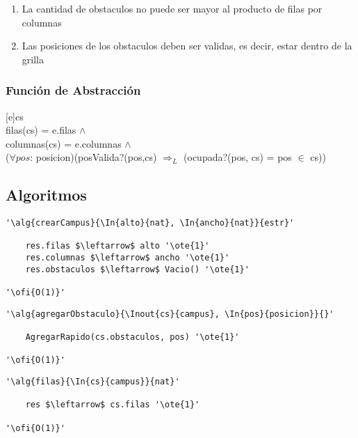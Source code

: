 \renewcommand{\labelenumi}{(\Roman{enumi})}

\begin{enumerate}
	\item{La cantidad de obstaculos no puede ser mayor al producto de filas por columnas}
	\item{Las posiciones de los obstaculos deben ser validas, es decir, estar dentro de la grilla}

\end{enumerate}

\mbox{}

\subsubsection{Funci\'on de Abstracci\'on}

[e]{cs}{
	\\
	filas(cs) = e.filas $\land$ \\
	columnas(cs) = e.columnas $\land$ \\
	($\forall pos$: posicion)(posValida?(pos,cs) $\Rightarrow_L$ (ocupada?(pos, cs) = pos $\in$ cs))
}

\subsection{Algoritmos}

\lstset{style=alg}

\begin{lstlisting}[mathescape]
'\alg{crearCampus}{\In{alto}{nat}, \In{ancho}{nat}}{estr}'
	
    res.filas $\leftarrow$ alto '\ote{1}'
    res.columnas $\leftarrow$ ancho '\ote{1}'
    res.obstaculos $\leftarrow$ Vacio() '\ote{1}'
    
'\ofi{O(1)}'
\end{lstlisting}

\begin{lstlisting}[mathescape]
'\alg{agregarObstaculo}{\Inout{cs}{campus}, \In{pos}{posicion}}{}'

	AgregarRapido(cs.obstaculos, pos) '\ote{1}'	

'\ofi{O(1)}'
\end{lstlisting}

\begin{lstlisting}[mathescape]
'\alg{filas}{\In{cs}{campus}}{nat}'

	res $\leftarrow$ cs.filas '\ote{1}'

'\ofi{O(1)}'
\end{lstlisting}

